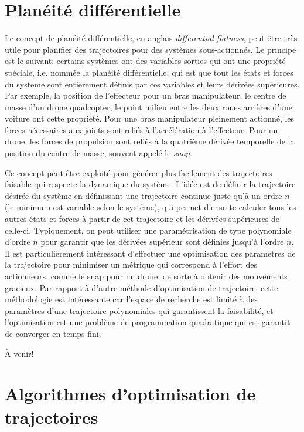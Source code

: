 \newpage
\section{Planéité différentielle}
\label{sec:searchalgo}

Le concept de planéité différentielle, en anglais \textit{differential flatness}, peut être très utile pour planifier des trajectoires pour des systèmes sous-actionnés. Le principe est le suivant: certains systèmes ont des variables sorties qui ont une propriété spéciale, i.e. nommée la planéité différentielle, qui est que tout les états et forces du système sont entièrement définis par ces variables et leurs dérivées supérieures. Par exemple, la position de l'effecteur pour un bras manipulateur, le centre de masse d'un drone quadcopter, le point milieu entre les deux roues arrières d'une voiture ont cette propriété. Pour une bras manipulateur pleinement actionné, les forces nécessaires aux joints sont reliés à l'accélération à l'effecteur. Pour un drone, les forces de propulsion sont reliés à la quatrième dérivée temporelle de la position du centre de masse, souvent appelé le \textit{snap}.

Ce concept peut être exploité pour générer plus facilement des trajectoires faisable qui respecte la dynamique du système. L'idée est de définir la trajectoire désirée du système en définissant une trajectoire continue juste qu'à un ordre $n$ (le minimum est variable selon le système), qui permet d'ensuite calculer tous les autres états et forces à partir de cet trajectoire et les dérivées supérieures de celle-ci. Typiquement, on peut utiliser une paramétrisation de type polynomiale d'ordre $n$ pour garantir que les dérivées supérieur sont définies jusqu'à l'ordre $n$. Il est particulièrement intéressant d'effectuer une optimisation des paramètres de la trajectoire pour minimiser un métrique qui correspond à l'effort des actionneurs, comme le snap pour un drone, de sorte à obtenir des mouvements gracieux. Par rapport à d'autre méthode d'optimisation de trajectoire, cette méthodologie est intéressante car l'espace de recherche est limité à des paramètres d'une trajectoire polynomiales qui garantissent la faisabilité, et l'optimisation est une problème de programmation quadratique qui est garantit de converger en temps fini. 

À venir!



\newpage
\section{Algorithmes d'optimisation de trajectoires}

